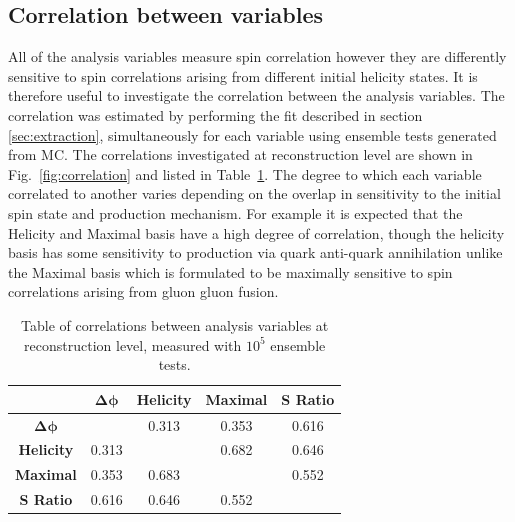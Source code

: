 \subsection{Correlation between variables}

All of the analysis variables measure spin correlation however they are differently sensitive to spin correlations arising from different initial helicity states. It is therefore useful to investigate the correlation between the analysis variables. The correlation was estimated by performing the fit described in section \ref{sec:extraction}, simultaneously for each variable using ensemble tests generated from MC. The correlations investigated at reconstruction level are shown in Fig.~\ref{fig:correlation} and listed in Table~\ref{tab:correlations}. The degree to which each variable correlated to another varies depending on the overlap in sensitivity to the initial spin state and production mechanism. For example it is expected that the Helicity and Maximal basis have a high degree of correlation, though the helicity basis has some sensitivity to production via quark anti-quark annihilation unlike the Maximal basis which is formulated to be maximally sensitive to spin correlations arising from gluon gluon fusion.

\begin{table}[htbp]
\begin{center}
\begin{tabular}{c | c c c c }
	                   & $\mathbf{\Delta\phi} $ & \textbf{Helicity} & \textbf{Maximal} & \textbf{S Ratio} \\
\hline
$\mathbf{\Delta\phi} $ &       & 0.313 & 0.353 & 0.616 \\
\textbf{Helicity}      & 0.313 &       & 0.682 & 0.646 \\
\textbf{Maximal}       & 0.353 & 0.683 &       & 0.552 \\
\textbf{S Ratio}       & 0.616 & 0.646 & 0.552 &       \\
	
\end{tabular}
\end{center}
\caption{Table of correlations between analysis variables at reconstruction level, measured with $10^5$ ensemble tests.}
\label{tab:correlations}
\end{table}

